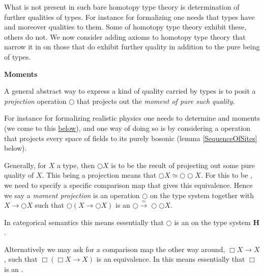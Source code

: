 \documentclass[12pt,titlepage]{article}
\theoremstyle{plain}
\theoremstyle{definition}
\theoremstyle{remark}
\begin{document}
What is not present in such bare homotopy type theory is determination of further qualities of types. For instance for  formalizing  one needs that types have  and moreover  qualities to them. Some  of homotopy type theory exhibit these, others do not. We now consider adding axioms to homotopy type theory that narrow it in on those  that do exhibit further quality in addition to the pure being of types.

\textbf{Moments}

A general abstract way to express a kind of quality carried by types is to posit a \emph{projection} operation $\bigcirc$ that projects out the \emph{moment of pure such quality}.

For instance for formalizing realistic physics one needs to determine \emph{} and \emph{} moments (we come to this \hyperlink{Externalization}{below}), and one way of doing so is by considering a  operation that projects every space of fields to its purely bosonic  (lemma \ref{SequenceOfSites} below).

Generally, for $X$ a type, then $\bigcirc X$ is to be the result of projecting out some pure quality of $X$. This being a projection means that $\bigcirc X  \simeq \bigcirc \bigcirc X$. For this to be , we need to specify a specific comparison map that gives this equivalence. Hence we say a \emph{moment projection} is an operation $\bigcirc$ on the type system together with  $X \to \bigcirc X$ such that $\bigcirc(X \to \bigcirc X)$ is an  $\bigcirc \stackrel{\simeq}{\longrightarrow} \bigcirc \bigcirc X$.

In categorical semantics this means essentially that $\bigcirc$ is an \emph{} on the type system $\mathbf{H}$.

Alternatively we may ask for a comparison map the other way around, $\Box X \longrightarrow X$, such that $\Box(\Box X \longrightarrow X)$ is an equivalence. In  this means essentially that $\Box$ is an .
\end{document}
